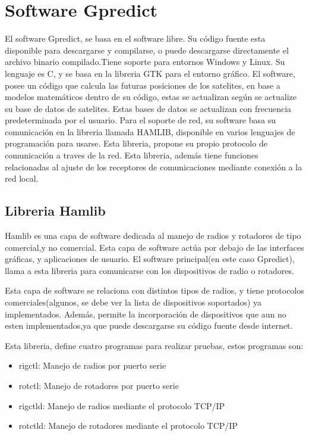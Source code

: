 \section{Software Gpredict} 
El software Gpredict, se basa en el software libre. Su código fuente esta disponible para descargarse y compilarse, o puede descargarse directamente el archivo binario compilado.Tiene soporte para entornos Windows y Linux. Su lenguaje es C, y se basa en la libreria GTK para el entorno gráfico. El software, posee un código que calcula las futuras posiciones de los satelites, en base a modelos matemáticos dentro de su código, estas se actualizan según se actualize su base de datos de satelites. Estas bases de datos se actualizan con frecuencia predeterminada por el usuario.  
Para el soporte de red, su software basa su comunicación en la libreria llamada HAMLIB, disponible en varios lenguajes de programación para usarse. Esta libreria, propone su propio protocolo de comunicación a traves de la red. Esta libreria, además tiene funciones relacionadas al ajuste de los receptores de comunicaciones mediante conexión a la red local.   

\subsection{Libreria Hamlib}
Hamlib es una capa de software dedicada al manejo de radios y rotadores de tipo comercial,y no comercial. Esta capa de software actúa por debajo de las interfaces gráficas, y aplicaciones de usuario. El software principal(en este caso Gpredict), llama a esta libreria para comunicarse con los dispositivos de radio o rotadores. 

Esta capa de software se relaciona con distintos tipos de radios, y tiene protocolos comerciales(algunos, se debe ver la lista de dispositivos soportados) ya implementados. Además, permite la incorporación de dispositivos que aun no esten implementados,ya que puede descargarse su código fuente desde internet. 

Esta libreria, define cuatro programas para realizar pruebas, estos programas son: 
\begin{itemize}
	\item rigctl: Manejo de radios por puerto serie 
	\item rotctl: Manejo de rotadores por puerto serie
	\item rigctld: Manejo de radios mediante el protocolo TCP/IP
	\item rotctld: Manejo de rotadores mediante el protocolo TCP/IP
\end{itemize}


